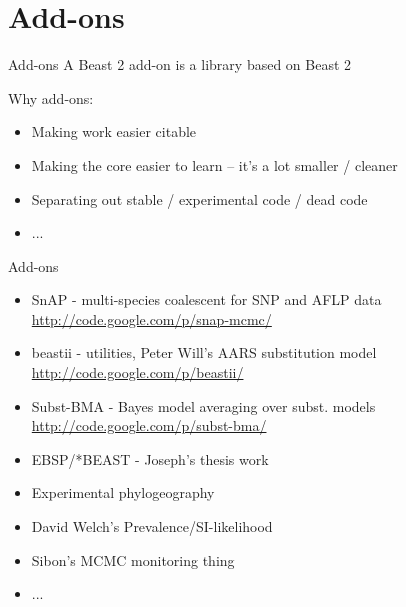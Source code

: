 \documentclass{beamer}
\theoremstyle{definition}
\begin{document}
\section{Add-ons}
\begin{frame}{Add-ons}
A Beast 2 add-on is a library based on Beast 2\vskip1cm

Why add-ons:
\begin{itemize}
\item Making work easier citable
\item Making the core easier to learn -- it's a lot smaller / cleaner
\item Separating out stable / experimental code / dead code
\item ...
\end{itemize}

\end{frame}

\begin{frame}{Add-ons}

\begin{itemize}
\item SnAP - multi-species coalescent for SNP and AFLP data
\url{http://code.google.com/p/snap-mcmc/}
\item beastii - utilities, Peter Will's AARS substitution model
\url{http://code.google.com/p/beastii/}
\item Subst-BMA - Bayes model averaging over subst. models
\url{http://code.google.com/p/subst-bma/}
\item EBSP/*BEAST - Joseph's thesis work
\item Experimental phylogeography
\item David Welch's Prevalence/SI-likelihood
\item Sibon's MCMC monitoring thing
\item ...
\end{itemize}
\end{frame}
\end{document}
